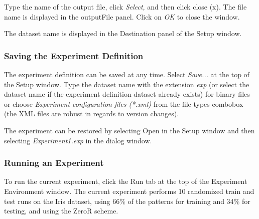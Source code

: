 \documentclass[a4paper]{article}
\begin{document}
\begin{center}
\end{center}

Type the name of the output file, click \textit{Select}, and then click close (x). The file name is displayed in the outputFile panel. Click on \textit{OK} to close the window.
\begin{center}
\end{center}

The dataset name is displayed in the Destination panel of the Setup window.
\begin{center}
\end{center}



\subsubsection*{Saving the Experiment Definition}

The experiment definition can be saved at any time. Select \textit{Save...} at the top of the Setup window. Type the dataset name with the extension \textit{exp} (or select the dataset name if the experiment definition dataset already exists) for binary files or choose \textit{Experiment configuration files (*.xml)} from the file types combobox (the XML files are robust in regards to version changes).
\begin{center}
\end{center}


The experiment can be restored by selecting Open in the Setup window and then selecting \textit{Experiment1.exp} in the dialog window.



\subsubsection{Running an Experiment}

To run the current experiment, click the Run tab at the top of the Experiment Environment window. The current experiment performs 10 randomized train and test runs on the Iris dataset, using 66\% of the patterns for training and 34\% for testing, and using the ZeroR scheme.
\begin{center}
\end{center}
\end{document}
